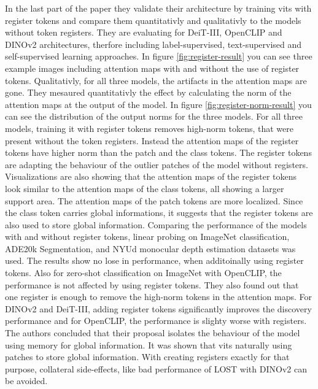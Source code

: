 \documentclass[conference]{IEEEtran}
\begin{document}
  In the last part of the paper they validate their architecture by training \acp{vit} with register tokens and compare them  quantitativly and qualitativly to the models without token registers. They are evaluating for \mbox{DeiT-III}, \mbox{OpenCLIP} and \mbox{DINOv2} architectures, therfore including label-supervised, text-supervised and self-supervised learning approaches. In figure \ref{fig:register-result} you can see three example images including attention maps with and without the use of register tokens. Qualitativly, for all three models, the artifacts in the attention maps are gone. They mesaured quantitativly the effect by calculating the norm of the attention maps at the output of the model. In figure \ref{fig:register-norm-result} you can see the distribution of the output norms for the three models. For all three models, training it with register tokens removes high-norm tokens, that were present without the token registers. Instead the attention maps of the register tokens have  higher norm than the patch and the class tokens. The register tokens are adapting the behaviour of the outlier patches of the model without registers. Visualizations are also showing that the attention maps of the register tokens look similar to the attention maps of the class tokens, all showing a larger support area. The attention maps of the patch tokens are more localized. Since the class token carries global informations, it suggests that the register tokens are also used to store global information. 
  Comparing the performance of the models with and without register tokens, linear probing on ImageNet classification, ADE20k Segmentation, and NYUd monocular depth estimation datasets was used. The results show no lose in performance, when additoinally using register tokens. Also for zero-shot classification on ImageNet with \mbox{OpenCLIP}, the performance is not affected by using register tokens. They also found out that one register is enough to remove the high-norm tokens in the attention maps. For \mbox{DINOv2} and \mbox{DeiT-III}, adding register tokens significantly improves the discovery performance and for \mbox{OpenCLIP}, the performance is slighty worse with registers. The authors concluded that their proposal isolates the behaviour of the model using memory for global information. It was shown that \acp{vit} naturally using patches to store global information. With creating registers exactly for that purpose, collateral side-effects, like bad performance of \mbox{LOST} with \mbox{DINOv2} can be avoided.

\end{document}
